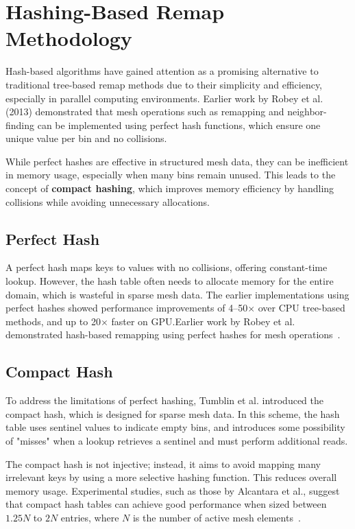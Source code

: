 \section{Hashing-Based Remap Methodology}

Hash-based algorithms have gained attention as a promising alternative to traditional tree-based remap methods due to their simplicity and efficiency, especially in parallel computing environments. Earlier work by Robey et al. (2013) demonstrated that mesh operations such as remapping and neighbor-finding can be implemented using perfect hash functions, which ensure one unique value per bin and no collisions.

While perfect hashes are effective in structured mesh data, they can be inefficient in memory usage, especially when many bins remain unused. This leads to the concept of \textbf{compact hashing}, which improves memory efficiency by handling collisions while avoiding unnecessary allocations.

\subsection{Perfect Hash}

A perfect hash maps keys to values with no collisions, offering constant-time lookup. However, the hash table often needs to allocate memory for the entire domain, which is wasteful in sparse mesh data. The earlier implementations using perfect hashes showed performance improvements of 4--50$\times$ over CPU tree-based methods, and up to 20$\times$ faster on GPU.Earlier work by Robey et al. demonstrated hash-based remapping using perfect hashes for mesh operations~\cite{Robey2013}.


\subsection{Compact Hash}

To address the limitations of perfect hashing, Tumblin et al. introduced the compact hash, which is designed for sparse mesh data. In this scheme, the hash table uses sentinel values to indicate empty bins, and introduces some possibility of "misses" when a lookup retrieves a sentinel and must perform additional reads.

The compact hash is not injective; instead, it aims to avoid mapping many irrelevant keys by using a more selective hashing function. This reduces overall memory usage. Experimental studies, such as those by Alcantara et al., suggest that compact hash tables can achieve good performance when sized between $1.25N$ to $2N$ entries, where $N$ is the number of active mesh elements~\cite{Alcantara2009,Tumblin2010}.


